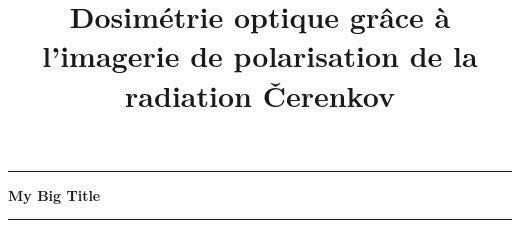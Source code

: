 \documentclass{article}
\title{Dosimétrie optique grâce à l'imagerie de polarisation de la radiation Čerenkov}
\begin{document}
\begin{center}
    \hrule
    \vspace{0.4cm}
    {\LARGE\bfseries My Big Title}
    \vspace{0.4cm}
    \hrule
\end{center}
\end{document}
